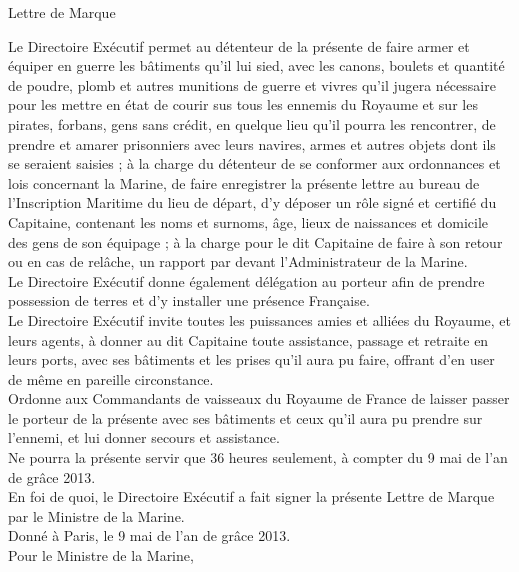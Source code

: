 {\selectfont \begin{center}\Large{Lettre de Marque}\end{center}

Le Directoire Exécutif permet au détenteur de la présente de faire
armer et équiper en guerre les bâtiments qu'il lui sied, avec les
canons, boulets et quantité de poudre, plomb et autres munitions de
guerre et vivres qu'il jugera nécessaire pour les mettre en état de
courir sus tous les ennemis du Royaume et sur les pirates, forbans,
gens sans crédit, en quelque lieu qu'il pourra les rencontrer, de
prendre et amarer prisonniers avec leurs navires, armes et autres
objets dont ils se seraient saisies ; à la charge du détenteur de se
conformer aux ordonnances et lois concernant la Marine, de faire
enregistrer la présente lettre au bureau de l'Inscription Maritime du
lieu de départ, d'y déposer un rôle signé et certifié du Capitaine,
contenant les noms et surnoms, âge, lieux de naissances et domicile
des gens de son équipage ; à la charge pour le dit Capitaine de faire
à son retour ou en cas de relâche, un rapport par devant
l'Administrateur de la Marine.\\

Le Directoire Exécutif donne également délégation au porteur afin de
prendre possession de terres et d'y installer une présence
Française.\\

Le Directoire Exécutif invite toutes les puissances amies et alliées
du Royaume, et leurs agents, à donner au dit Capitaine toute
assistance, passage et retraite en leurs ports, avec ses bâtiments et
les prises qu'il aura pu faire, offrant d'en user de même en pareille
circonstance.\\

Ordonne aux Commandants de vaisseaux du Royaume de France de laisser
passer le porteur de la présente avec ses bâtiments et ceux qu'il aura
pu prendre sur l'ennemi, et lui donner secours et assistance.\\

Ne pourra la présente servir que 36 heures seulement, à compter du 9
mai de l'an de grâce 2013.\\

En foi de quoi, le Directoire Exécutif a fait signer la présente
Lettre de Marque par le Ministre de la Marine.\\

Donné à Paris, le 9 mai de l'an de grâce 2013.\\

Pour le Ministre de la Marine,}

